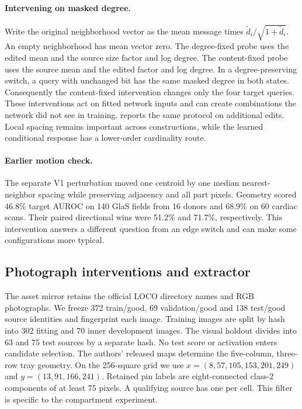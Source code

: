\paragraph{Intervening on masked degree.}
Write the original neighborhood vector as the mean message times $\tilde d_i/\sqrt{1+\tilde d_i}$. An empty neighborhood has mean vector zero. The degree-fixed probe uses the edited mean and the source size factor and log degree. The content-fixed probe uses the source mean and the edited factor and log degree. In a degree-preserving switch, a query with unchanged bit has the same masked degree in both states. Consequently the content-fixed intervention changes only the four target queries. These interventions act on fitted network inputs and can create combinations the network did not see in training.  reports the same protocol on additional edits. Local spacing remains important across constructions, while the learned conditional response has a lower-order cardinality route.

\begin{table}[t]
\centering
\caption{\textbf{Degree intervention on the fitted GNN.} Response ranks absolute changes in probability. Paired 95\% intervals are shown. Repeated edits reuse the original donors.}
\label{tab:degree}
\scriptsize

\end{table}

\paragraph{Earlier motion check.}
The separate V1 perturbation moved one centroid by one median nearest-neighbor spacing while preserving adjacency and all part pixels. Geometry scored 46.8\% target AUROC on 140 GlaS fields from 16 donors and 68.9\% on 60 cardiac scans. Their paired directional wins were 51.2\% and 71.7\%, respectively. This intervention answers a different question from an edge switch and can make some configurations more typical.

\subsection{Photograph interventions and extractor}
The asset mirror retains the official LOCO directory names and RGB photographs. We freeze 372 train/good, 69 validation/good and 138 test/good source identities and fingerprint each image. Training images are split by hash into 302 fitting and 70 inner development images. The visual holdout divides into 63 and 75 test sources by a separate hash. No test score or activation enters candidate selection. The authors' released maps determine the five-column, three-row tray geometry. On the 256-square grid we use $x=(8,57,105,153,201,249)$ and $y=(13,91,166,241)$. Retained pin labels are eight-connected class-2 components of at least 75 pixels. A qualifying source has one per cell. This filter is specific to the compartment experiment.

